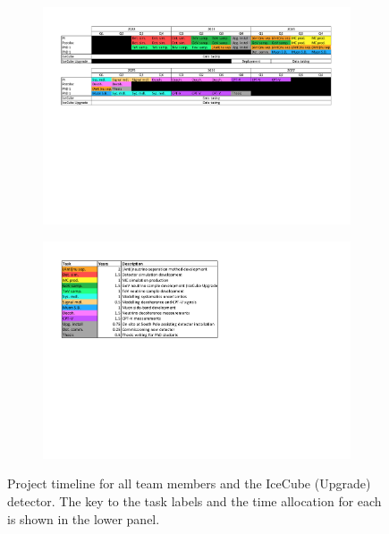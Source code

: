 \documentclass[a4paper,11pt]{article}
\begin{document}
\begin{figure}[h]
    \begin{subfigure}[c]{1.\textwidth}
    \centering
    \includegraphics[trim=1.7cm 11.1cm 1.7cm 1.0cm, clip=true, width=0.99\linewidth]{images/TaskPlanning.pdf}
    \end{subfigure}
    \begin{subfigure}[c]{1.\textwidth}
    \centering
    \includegraphics[trim=1.7cm 11.5cm 12.3cm 1.5cm, clip=true, width=0.5\linewidth]{images/TaskPlanningLegend.pdf}
    \end{subfigure}
	\caption{Project timeline for all team members and the IceCube (Upgrade) detector. The key to the task labels and the time allocation for each is shown in the lower panel.}
	\label{fig:timeline}
\end{figure}
\end{document}
